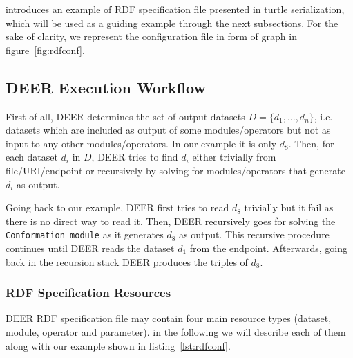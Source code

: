 \documentclass[a4paper,twoside,bibtotoc,abstracton,12pt,BCOR=15mm]{article}
\newcommand{\geolift}{\textsc{DEER}\xspace}
\begin{document}
introduces an example of RDF specification file presented in turtle serialization, which will be used as a guiding example through the next subsections.
For the sake of  clarity, we represent the configuration file in form of graph in figure~\ref{fig:rdfconf}.


\subsection{\geolift Execution Workflow}
First of all, \geolift determines the set of output datasets $D = \{d_1, \dots , d_n\}$, 
i.e. datasets which are included as output of some modules/operators but not as input to any other modules/operators.
In our example it is only $d_8$.
Then, for each dataset $d_i$ in $D$, \geolift tries to find $d_i$ either trivially from file/URI/endpoint or recursively by solving for modules/operators that generate $d_i$ as output.

Going back to our example, \geolift first tries to read $d_8$ trivially but it fail as there is no direct way to read it. 
Then, \geolift recursively goes for solving the \texttt{Conformation module} as it generates $d_8$ as output. 
This recursive procedure continues until \geolift reads the dataset $d_1$ from the endpoint.
Afterwards, going back in the recursion stack \geolift produces the triples of $d_8$.

\subsubsection{RDF Specification Resources} 

\geolift RDF specification file may contain four main resource types (dataset, module, operator and parameter). 
in the following we will describe each of them along with our example shown in listing~\ref{lst:rdfconf}. 

\end{document}
